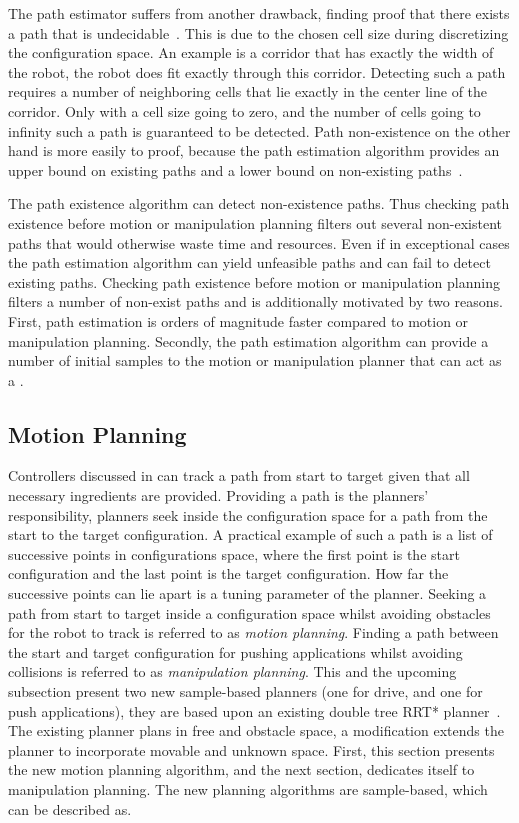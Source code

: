 The path estimator suffers from another drawback, finding proof that there exists a path that is undecidable~\cite{zhang_simple_2008}. This is due to the chosen cell size during discretizing the configuration space. An example is a corridor that has exactly the width of the robot, the robot does fit exactly through this corridor. Detecting such a path requires a number of neighboring cells that lie exactly in the center line of the corridor. Only with a cell size going to zero, and the number of cells going to infinity such a path is guaranteed to be detected. Path non-existence on the other hand is more easily to proof, because the path estimation algorithm provides an upper bound on existing paths and a lower bound on non-existing paths~\cite{zhang_simple_2008}.\bs

The path existence algorithm can detect non-existence paths. Thus checking path existence before motion or manipulation planning filters out several non-existent paths that would otherwise waste time and resources. Even if in exceptional cases the path estimation algorithm can yield unfeasible paths and can fail to detect existing paths. Checking path existence before motion or manipulation planning filters a number of non-exist paths and is additionally motivated by two reasons. First, path estimation is orders of magnitude faster compared to motion or manipulation planning. Secondly, the path estimation algorithm can provide a number of initial samples to the motion or manipulation planner that can act as a .

\subsection{Motion Planning}%
\label{subsec:motion_planning}
Controllers discussed in  can track a path from start to target given that all necessary ingredients are provided. Providing a path is the planners' responsibility, planners seek inside the configuration space for a path from the start to the target configuration. A practical example of such a path is a list of successive points in configurations space, where the first point is the start configuration and the last point is the target configuration. How far the successive points can lie apart is a tuning parameter of the planner. Seeking a path from start to target inside a configuration space whilst avoiding obstacles for the robot to track is referred to as \textit{motion planning}. Finding a path between the start and target configuration for pushing applications whilst avoiding collisions is referred to as \textit{manipulation planning}. This and the upcoming subsection present two new sample-based planners (one for drive, and one for push applications), they are based upon an existing double tree \ac{RRT*} planner~\cite{chen_fast_2018}. The existing planner plans in free and obstacle space, a modification extends the planner to incorporate movable and unknown space. First, this section presents the new motion planning algorithm, and the next section,  dedicates itself to manipulation planning. The new planning algorithms are sample-based, which can be described as.\bs

